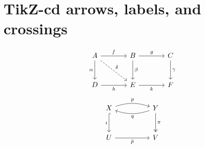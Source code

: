 \documentclass[11pt]{article}
\begin{document}
\pagestyle{empty}
\section*{TikZ-cd arrows, labels, and crossings}
\[
\begin{tikzcd}[column sep=large,row sep=large]
  A \arrow[r, "f"] \arrow[d, swap, "\alpha"] \arrow[dr, dashed, "\delta"] &
  B \arrow[r, "g"] \arrow[d, "\beta"] & C \arrow[d, "\gamma"] \\
  D \arrow[r, swap, "h"] & E \arrow[r, swap, "k"] & F
\end{tikzcd}
\]
\[
\begin{tikzcd}[column sep=huge, row sep=large]
  X \arrow[r, bend left=18, "p"] \arrow[d, hook, swap, "i"] &
  Y \arrow[l, bend left=18, "q"] \arrow[d, two heads, "\pi"] \\
  U \arrow[r, swap, "\bar p"] & V
\end{tikzcd}
\]
\end{document}
